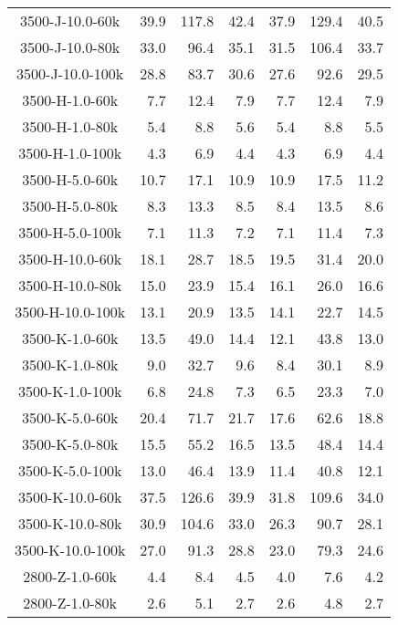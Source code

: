 \begin{longtable}{crrrrrr}
      3500-J-10.0-60k  &  39.9 & 117.8 &  42.4 &  37.9 & 129.4 &  40.5 \\
      3500-J-10.0-80k  &  33.0 &  96.4 &  35.1 &  31.5 & 106.4 &  33.7 \\
      3500-J-10.0-100k &  28.8 &  83.7 &  30.6 &  27.6 &  92.6 &  29.5 \\
      3500-H-1.0-60k   &   7.7 &  12.4 &   7.9 &   7.7 &  12.4 &   7.9 \\
      3500-H-1.0-80k   &   5.4 &   8.8 &   5.6 &   5.4 &   8.8 &   5.5 \\
      3500-H-1.0-100k  &   4.3 &   6.9 &   4.4 &   4.3 &   6.9 &   4.4 \\
      3500-H-5.0-60k   &  10.7 &  17.1 &  10.9 &  10.9 &  17.5 &  11.2 \\
      3500-H-5.0-80k   &   8.3 &  13.3 &   8.5 &   8.4 &  13.5 &   8.6 \\
      3500-H-5.0-100k  &   7.1 &  11.3 &   7.2 &   7.1 &  11.4 &   7.3 \\
      3500-H-10.0-60k  &  18.1 &  28.7 &  18.5 &  19.5 &  31.4 &  20.0 \\
      3500-H-10.0-80k  &  15.0 &  23.9 &  15.4 &  16.1 &  26.0 &  16.6 \\
      3500-H-10.0-100k &  13.1 &  20.9 &  13.5 &  14.1 &  22.7 &  14.5 \\
      3500-K-1.0-60k   &  13.5 &  49.0 &  14.4 &  12.1 &  43.8 &  13.0 \\
      3500-K-1.0-80k   &   9.0 &  32.7 &   9.6 &   8.4 &  30.1 &   8.9 \\
      3500-K-1.0-100k  &   6.8 &  24.8 &   7.3 &   6.5 &  23.3 &   7.0 \\
      3500-K-5.0-60k   &  20.4 &  71.7 &  21.7 &  17.6 &  62.6 &  18.8 \\
      3500-K-5.0-80k   &  15.5 &  55.2 &  16.5 &  13.5 &  48.4 &  14.4 \\
      3500-K-5.0-100k  &  13.0 &  46.4 &  13.9 &  11.4 &  40.8 &  12.1 \\
      3500-K-10.0-60k  &  37.5 & 126.6 &  39.9 &  31.8 & 109.6 &  34.0 \\
      3500-K-10.0-80k  &  30.9 & 104.6 &  33.0 &  26.3 &  90.7 &  28.1 \\
      3500-K-10.0-100k &  27.0 &  91.3 &  28.8 &  23.0 &  79.3 &  24.6 \\
      2800-Z-1.0-60k   &   4.4 &   8.4 &   4.5 &   4.0 &   7.6 &   4.2 \\
      2800-Z-1.0-80k   &   2.6 &   5.1 &   2.7 &   2.6 &   4.8 &   2.7 \\

\end{longtable}

